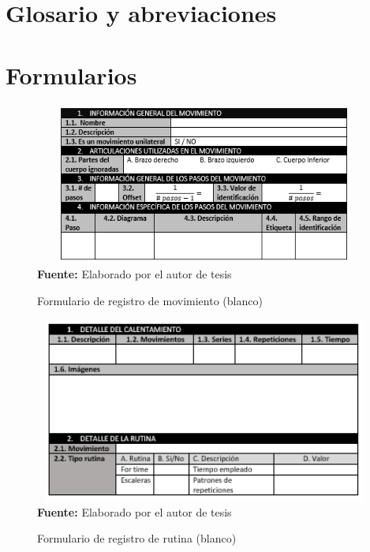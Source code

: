 \afterpage{\blankpage}
\newpage
\afterpage{\blankpage}
\newpage
\appendix
\renewcommand{\thesection}{A.\arabic{section}}
\renewcommand{\thesubsection}{A.\arabic{section}.\arabic{subsection}}
\renewcommand{\thesubsubsection}{A.\arabic{section}.\arabic{subsection}.\arabic{subsubsection}}
\renewcommand\thefigure{A.\arabic{section}.\arabic{figure}}   
\renewcommand\thetable{A.\arabic{section}.\arabic{table}}  
\renewcommand\thecode{A.\arabic{section}.\arabic{code}}  
\appendixpage
\addappheadtotoc
\section{Glosario y abreviaciones}
\printglossary
\printglossary[type=\acronymtype, title=Abreviaciones]
\section{Formularios}
\begin{figure}[H]
	\caption{Formulario de  registro de movimiento (blanco)}
	\label{fig:frmWhiteMov}
	\centering
	\includegraphics[width=430px,height=200px]{graphics/frm-movimiento.PNG} \\
	\textbf{Fuente:} Elaborado por el autor de tesis
\end{figure}

\begin{figure}[H]
	\caption{Formulario de  registro de rutina (blanco)}
	\label{fig:frmWhiteRout}
	\centering
	\includegraphics[width=430px,height=230px]{graphics/frm-rutina.PNG} \\
	\textbf{Fuente:} Elaborado por el autor de tesis
\end{figure}
